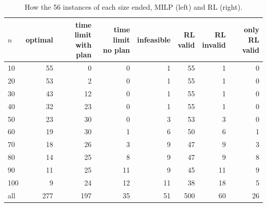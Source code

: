 \begin{table}[H]\centering
\small
\caption{How the 56 instances of each size ended, MILP (left) and RL (right).}\label{tab:statusn}
\begin{adjustbox}{max width=\textwidth}\begin{tabular}{lrrrrrrr}\toprule
$n$ & optimal & \shortstack{time limit\\with plan} & \shortstack{time limit\\no plan} & infeasible & \shortstack{RL\\valid} & \shortstack{RL\\invalid} & \shortstack{only RL\\valid} \\ \midrule
10 & 55 & 0 & 0 & 1 & 55 & 1 & 0 \\
20 & 53 & 2 & 0 & 1 & 55 & 1 & 0 \\
30 & 43 & 12 & 0 & 1 & 55 & 1 & 0 \\
40 & 32 & 23 & 0 & 1 & 55 & 1 & 0 \\
50 & 23 & 30 & 0 & 3 & 53 & 3 & 0 \\
60 & 19 & 30 & 1 & 6 & 50 & 6 & 1 \\
70 & 18 & 26 & 3 & 9 & 47 & 9 & 3 \\
80 & 14 & 25 & 8 & 9 & 47 & 9 & 8 \\
90 & 11 & 25 & 11 & 9 & 45 & 11 & 9 \\
100 & 9 & 24 & 12 & 11 & 38 & 18 & 5 \\
\midrule all & 277 & 197 & 35 & 51 & 500 & 60 & 26 \\
\bottomrule\end{tabular}\end{adjustbox}\end{table}
